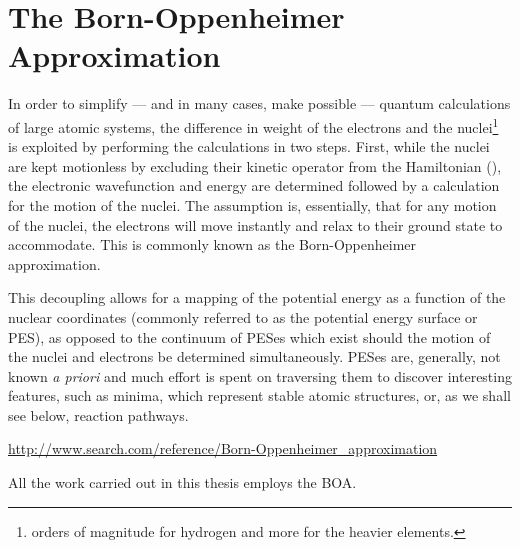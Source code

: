 \section{The Born-Oppenheimer Approximation}
\label{sec:born-oppenheimer}

In order to simplify --- and in many cases, make possible --- quantum calculations of large atomic systems, the difference in weight of the electrons and the nuclei\footnote{ orders of magnitude for hydrogen and more for the heavier elements.} is exploited by performing the calculations in two steps.
First, while the nuclei are kept motionless by excluding their kinetic operator from the Hamiltonian (), the electronic wavefunction and energy are determined followed by a calculation for the motion of the nuclei.
The assumption is, essentially, that for any motion of the nuclei, the electrons will move instantly and relax to their ground state to accommodate.
This is commonly known as the Born-Oppenheimer approximation.\cite{born-oppenheimer-1927}


This decoupling allows for a mapping of the potential energy as a function of the nuclear coordinates (commonly referred to as the potential energy surface or PES), as opposed to the continuum of PESes which exist should the motion of the nuclei and electrons be determined simultaneously.
PESes are, generally, not known \textit{a priori} and much effort is spent on traversing them to discover interesting features, such as minima, which represent stable atomic structures, or, as we shall see below, reaction pathways.


\url{http://www.search.com/reference/Born-Oppenheimer_approximation}


All the work carried out in this thesis employs the BOA.
